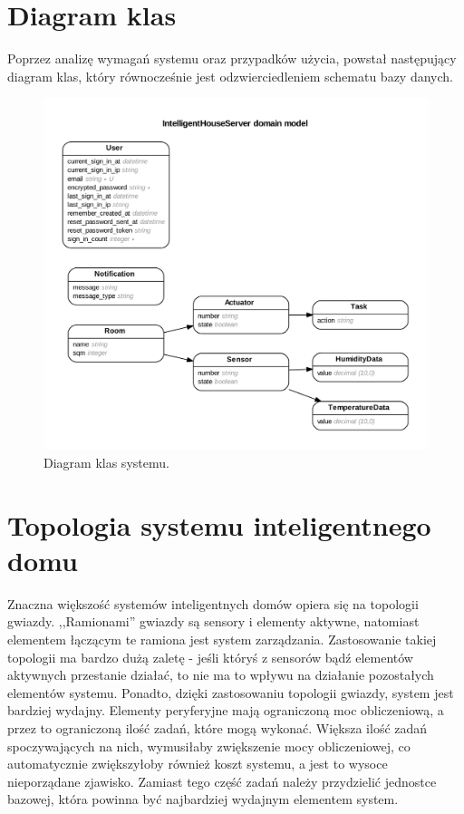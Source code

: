 \documentclass[eng,oneside]{mgr}
\begin{document}
\clearpage

\section{Diagram klas} %
\label{sec:diagram_klas}
Poprzez analizę wymagań systemu oraz przypadków użycia, powstał następujący diagram klas, który równocześnie jest odzwierciedleniem schematu bazy danych.
\begin{figure}[h]
\centering
\includegraphics[width=\linewidth]{./erd}
\caption{Diagram klas systemu.}
\label{fig:diagram_encje}
\end{figure}

\section{Topologia systemu inteligentnego domu}
\label{sec:topologia_systemu}
Znaczna większość systemów inteligentnych domów opiera się na topologii gwiazdy. ,,Ramionami'' gwiazdy są sensory i elementy aktywne, natomiast elementem łączącym te ramiona jest system zarządzania. Zastosowanie takiej topologii ma bardzo dużą zaletę - jeśli któryś z sensorów bądź elementów aktywnych przestanie działać, to nie ma to wpływu na działanie pozostałych elementów systemu. Ponadto, dzięki zastosowaniu topologii gwiazdy, system jest bardziej wydajny. Elementy peryferyjne mają ograniczoną moc obliczeniową, a przez to ograniczoną ilość zadań, które mogą wykonać. Większa ilość zadań spoczywających na nich, wymusiłaby zwiększenie mocy obliczeniowej, co automatycznie zwiększyłoby również koszt systemu, a jest to wysoce nieporządane zjawisko. Zamiast tego część zadań należy przydzielić jednostce bazowej, która powinna być najbardziej wydajnym elementem system.
\end{document}
